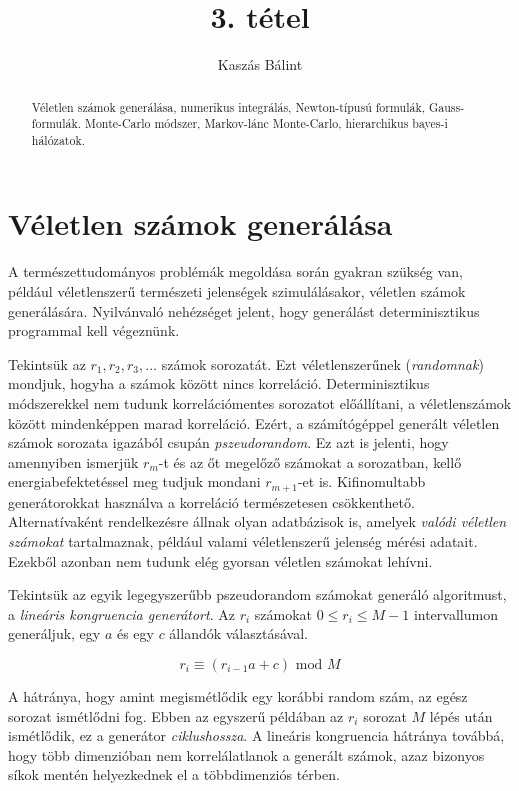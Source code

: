\documentclass[12pt]{article}
\theoremstyle{plain}
\begin{document}
\title{3. tétel}
\author{Kaszás Bálint}

\maketitle


\newpage
\begin{abstract}
    Véletlen számok generálása, numerikus integrálás, Newton-típusú formulák, Gauss-formulák. Monte-Carlo módszer, Markov-lánc Monte-Carlo, hierarchikus bayes-i hálózatok.
\end{abstract}

\section{Véletlen számok generálása}
A természettudományos problémák megoldása során gyakran szükség van, például véletlenszerű természeti jelenségek szimulálásakor, véletlen számok generálására. 
Nyilvánvaló nehézséget jelent, hogy generálást determinisztikus programmal kell végeznünk. 

Tekintsük az $r_1, r_2, r_3, ...$ számok sorozatát. Ezt véletlenszerűnek ({\em randomnak}) mondjuk, hogyha a számok között nincs korreláció. Determinisztikus módszerekkel nem tudunk korrelációmentes sorozatot előállítani, a véletlenszámok között mindenképpen marad korreláció. Ezért, a számítógéppel generált véletlen számok sorozata igazából csupán {\em pszeudorandom}. Ez azt is jelenti, hogy amennyiben ismerjük $r_m$-t és az őt megelőző számokat a sorozatban, kellő energiabefektetéssel meg tudjuk mondani $r_{m+1}$-et is. 
Kifinomultabb generátorokkat használva a korreláció természetesen csökkenthető. Alternatívaként rendelkezésre állnak olyan adatbázisok is, amelyek {\em valódi véletlen számokat} tartalmaznak, például valami véletlenszerű jelenség mérési adatait. Ezekből azonban nem tudunk elég gyorsan véletlen számokat lehívni.

Tekintsük az egyik legegyszerűbb pszeudorandom számokat generáló algoritmust, a {\em lineáris kongruencia generátort}. Az $r_i$ számokat $0 \leq r_i \leq M-1$ intervallumon generáljuk, egy $a$ és egy $c$ állandók választásával. 

\begin{equation}
    \label{lincong}
    r_i \equiv (r_{i-1}a + c) \text{ mod } M
\end{equation}

A hátránya, hogy amint megismétlődik egy korábbi random szám, az egész sorozat ismétlődni fog. Ebben az egyszerű példában az $r_i$ sorozat $M$ lépés után ismétlődik, ez a generátor {\em ciklushossza}. A lineáris kongruencia hátránya továbbá, hogy több dimenzióban nem korrelálatlanok a generált számok, azaz bizonyos síkok mentén helyezkednek el a többdimenziós térben.
\end{document}
